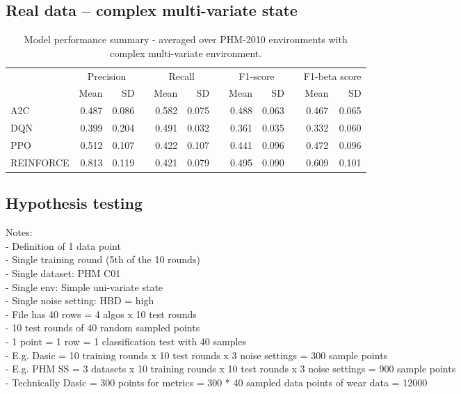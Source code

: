 \documentclass[a4paper, 12pt]{article}
\newcommand{\rowspace}[1]{\renewcommand{\arraystretch}{#1}}
\begin{document}
\subsection{Real data -- complex multi-variate state}
\begin{table}[hbt!]\centering
	\sffamily
	\rowspace{1.3}
	\begin{tabular}{@{}l rr c rr c rr c rr@{}}
		\arrayrulecolor{black!40}\toprule
		& \multicolumn{2}{c}{Precision} & \phantom{i} & \multicolumn{2}{c}{Recall} & \phantom{i} & \multicolumn{2}{c}{F1-score} & \phantom{i} & \multicolumn{2}{c}{F1-beta score} \\
		\cmidrule{2-3} \cmidrule{5-6} \cmidrule{8-9} \cmidrule{11-12} 
		
		&Mean &SD & &Mean &SD & &Mean &SD& &Mean & SD\\ \midrule
		A2C & 0.487 & 0.086 & &0.582 & 0.075 & & 0.488 & 0.063 & &0.467 &0.065 \\
		DQN & 0.399 & 0.204 & &0.491 & 0.032 & & 0.361 & 0.035 & &0.332 &0.060 \\
		PPO & 0.512 & 0.107 & &0.422 & 0.107 & & 0.441 & 0.096 & &0.472 &0.096 \\
		REINFORCE & 0.813 & 0.119 & &0.421 & 0.079 & & 0.495 & 0.090 & &0.609 &0.101 \\
		
		
		\bottomrule
	\end{tabular}
	\caption{Model performance summary - averaged over PHM-2010 environments with complex multi-variate environment.}
	\label{tbl:PHMMS}
\end{table}

\subsection{Hypothesis testing}

Notes: \\
- Definition of 1 data point\\
- Single training round (5th of the 10 rounds)\\
- Single dataset:  PHM C01\\
- Single env:  Simple uni-variate state\\
- Single noise setting:  HBD = high\\
- File has 40 rows = 4 algos x 10 test rounds\\
- 10 test rounds of 40 random sampled points\\
- 1 point = 1 row = 1 classification test with 40 samples\\
- E.g. Dasic = 10 training rounds x 10 test rounds x 3 noise settings = 300 sample points\\
- E.g. PHM SS = 3 datasets x 10 training rounds x 10 test rounds x 3 noise settings = 900 sample points\\
- Technically Dasic = 300 points for metrics = 300 * 40 sampled data points of wear data = 12000\\
\end{document}
